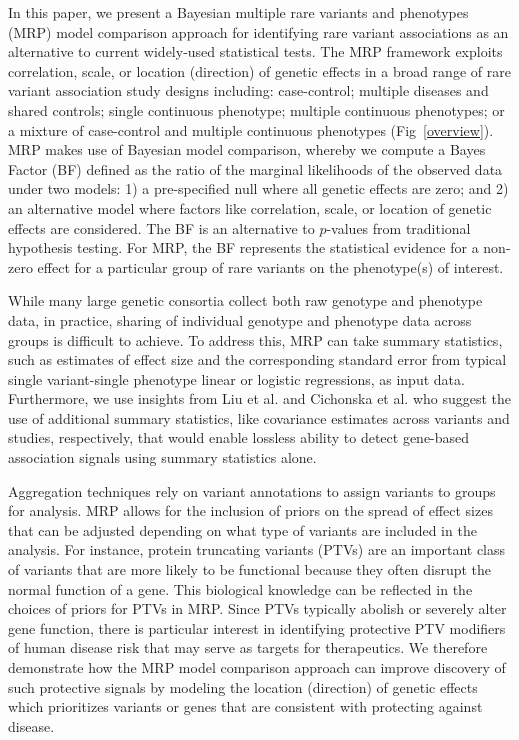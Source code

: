In this paper, we present a Bayesian multiple rare variants and phenotypes (MRP) model comparison approach for identifying rare variant associations as an alternative to current widely-used statistical tests. The MRP framework exploits correlation, scale, or location (direction) of genetic effects in a broad range of rare variant association study designs including: case-control; multiple diseases and shared controls; single continuous phenotype; multiple continuous phenotypes; or a mixture of case-control and multiple continuous phenotypes (Fig~\ref{overview}). MRP makes use of Bayesian model comparison, whereby we compute a Bayes Factor (BF) defined as the ratio of the marginal likelihoods of the observed data under two models: 1) a pre-specified null where all genetic effects are zero; and 2) an alternative model where factors like correlation, scale, or location of genetic effects are considered. The BF is an alternative to $p$-values from traditional hypothesis testing. For MRP, the BF represents the statistical evidence for a non-zero effect for a particular group of rare variants on the phenotype(s) of interest.


While many large genetic consortia collect both raw genotype and phenotype data, in practice, sharing of individual genotype and phenotype data across groups is difficult to achieve. To address this, MRP can take summary statistics, such as estimates of effect size and the corresponding standard error from typical single variant-single phenotype linear or logistic regressions, as input data. Furthermore, we use insights from Liu et al.\cite{liu2014meta} and Cichonska et al.\cite{cichonska2016metacca} who suggest the use of additional summary statistics, like covariance estimates across variants and studies, respectively, that would enable lossless ability to detect gene-based association signals using summary statistics alone.  

Aggregation techniques rely on variant annotations to assign variants to groups for analysis. MRP allows for the inclusion of priors on the spread of effect sizes that can be adjusted depending on what type of variants are included in the analysis. For instance, protein truncating variants (PTVs)\cite{rivas2013assessing,rivas2015effect} are an important class of variants that are more likely to be functional because they often disrupt the normal function of a gene. This biological knowledge can be reflected in the choices of priors for PTVs in MRP. Since PTVs typically abolish or severely alter gene function, there is particular interest in identifying protective PTV modifiers of human disease risk that may serve as targets for therapeutics\cite{pcsk9,cohen2006sequence,sullivan2012effect}. We therefore demonstrate how the MRP model comparison approach can improve discovery of such protective signals by modeling the location (direction) of genetic effects which prioritizes variants or genes that are consistent with protecting against disease. 

